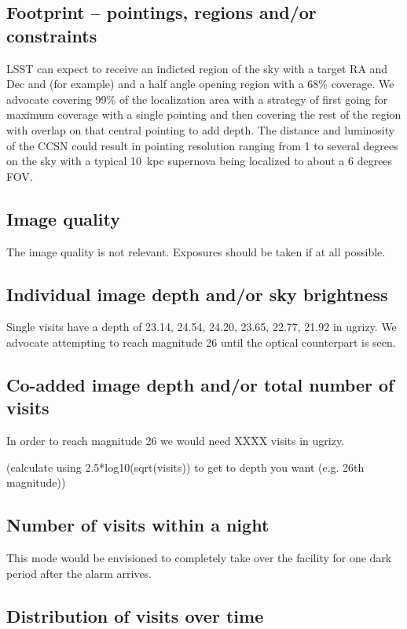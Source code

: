 \documentclass[12pt, letterpaper]{article}
\begin{document}
\subsection{Footprint -- pointings, regions and/or constraints}

LSST can expect to receive an indicted region of the sky with a target
RA and Dec and (for example) and a half angle opening region with a
68\% coverage.  We advocate covering 99\% of the
localization area with a strategy of first going for maximum coverage
with a single pointing and then covering the rest of the region with
overlap on that central pointing to add depth.  The distance and
luminosity of the CCSN could result in pointing resolution ranging 
from 1 to several degrees on the sky with a typical 10~kpc supernova
being localized to about a 6 degrees FOV.

\subsection{Image quality}

The image quality is not relevant.  Exposures should be taken if at all possible.

\subsection{Individual image depth and/or sky brightness}

Single visits have a depth of 23.14,  24.54, 24.20, 23.65, 22.77,
21.92 in ugrizy.  We advocate attempting to reach magnitude 26 until
the optical counterpart is seen.

\subsection{Co-added image depth and/or total number of visits}

In order to reach magnitude 26 we would need XXXX visits in ugrizy.

(calculate using 2.5*log10(sqrt(visits)) to get to depth you want (e.g. 26th magnitude))

\subsection{Number of visits within a night}

This mode would be envisioned to completely take over the facility for
one dark period after the alarm arrives.

\subsection{Distribution of visits over time}
\end{document}
